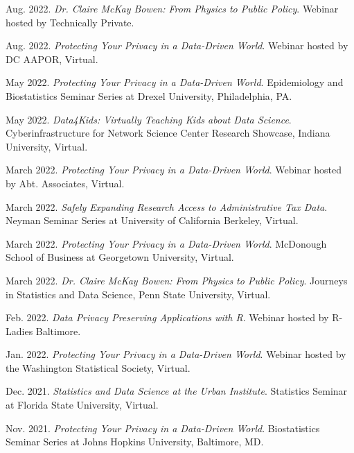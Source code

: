 \begin{etaremune}[topsep=0pt, itemsep=5pt, partopsep=0pt, parsep=0pt]
    \item Aug. 2022. \textit{Dr. Claire McKay Bowen: From Physics to Public Policy}. Webinar hosted by Technically Private.
    
    \item Aug. 2022. \textit{Protecting Your Privacy in a Data-Driven World}. Webinar hosted by DC AAPOR, Virtual.
    
    \item May 2022. \textit{Protecting Your Privacy in a Data-Driven World}. Epidemiology and Biostatistics Seminar Series at Drexel University, Philadelphia, PA.
    
    \item May 2022. \textit{Data4Kids: Virtually Teaching Kids about Data Science}. Cyberinfrastructure for Network Science Center Research Showcase, Indiana University, Virtual.
    
    \item March 2022. \textit{Protecting Your Privacy in a Data-Driven World}. Webinar hosted by Abt. Associates, Virtual.
    
    \item March 2022. \textit{Safely Expanding Research Access to Administrative Tax Data}. Neyman Seminar Series at University of California Berkeley, Virtual.
    
    \item March 2022. \textit{Protecting Your Privacy in a Data-Driven World}. McDonough School of Business at Georgetown University, Virtual.
    
    \item March 2022. \textit{Dr. Claire McKay Bowen: From Physics to Public Policy}. Journeys in Statistics and Data Science, Penn State University, Virtual.
        
    \item Feb. 2022. \textit{Data Privacy Preserving Applications with R}. Webinar hosted by R-Ladies Baltimore.

    \item Jan. 2022. \textit{Protecting Your Privacy in a Data-Driven World}. Webinar hosted by the Washington Statistical Society, Virtual.
    
    \item Dec. 2021. \textit{Statistics and Data Science at the Urban Institute}. Statistics Seminar at Florida State University, Virtual.
    
    \item Nov. 2021. \textit{Protecting Your Privacy in a Data-Driven World}. Biostatistics Seminar Series at Johns Hopkins University, Baltimore, MD.
    

\end{etaremune}

